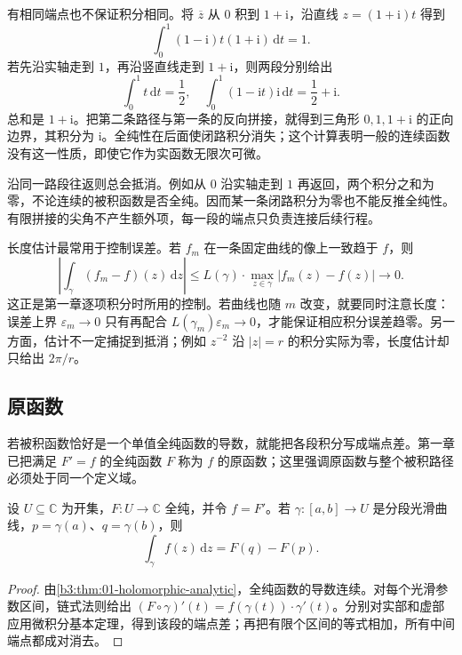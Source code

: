 \ProseParagraphBreak

有相同端点也不保证积分相同。将 \(\overline z\) 从 \(0\) 积到 \(1+\mathrm{i}\)，沿直线 \(z=(1+\mathrm{i})t\) 得到
\[
 \int_0^1(1-\mathrm{i})t(1+\mathrm{i})\,\mathrm{d}t=1.
\]
若先沿实轴走到 \(1\)，再沿竖直线走到 \(1+\mathrm{i}\)，则两段分别给出
\[
 \int_0^1t\,\mathrm{d}t=\frac12,
 \quad
 \int_0^1(1-\mathrm{i}t)\mathrm{i}\,\mathrm{d}t
 =\frac12+\mathrm{i}.
\]
总和是 \(1+\mathrm{i}\)。把第二条路径与第一条的反向拼接，就得到三角形 \(0,1,1+\mathrm{i}\) 的正向边界，其积分为 \(\mathrm{i}\)。全纯性在后面使闭路积分消失；这个计算表明一般的连续函数没有这一性质，即使它作为实函数无限次可微。

\ProseParagraphBreak

沿同一路段往返则总会抵消。例如从 \(0\) 沿实轴走到 \(1\) 再返回，两个积分之和为零，不论连续的被积函数是否全纯。因而某一条闭路积分为零也不能反推全纯性。有限拼接的尖角不产生额外项，每一段的端点只负责连接后续行程。

\ProseParagraphBreak

长度估计最常用于控制误差。若 \(f_m\) 在一条固定曲线的像上一致趋于 \(f\)，则
\[
 \left|\int_\gamma(f_m-f)(z)\,\mathrm{d}z\right|
 \le L(\gamma)\cdot\max_{z\in\gamma}|f_m(z)-f(z)|
 \longrightarrow0.
\]
这正是第一章逐项积分时所用的控制。若曲线也随 \(m\) 改变，就要同时注意长度：误差上界 \(\varepsilon_m\to0\) 只有再配合 \(L(\gamma_m)\varepsilon_m\to0\)，才能保证相应积分误差趋零。另一方面，估计不一定捕捉到抵消；例如 \(z^{-2}\) 沿 \(|z|=r\) 的积分实际为零，长度估计却只给出 \(2\pi/r\)。

\subsection{原函数}
\label{b3:subsec:020103}

若被积函数恰好是一个单值全纯函数的导数，就能把各段积分写成端点差。第一章已把满足 \(F'=f\) 的全纯函数 \(F\) 称为 \(f\) 的原函数；这里强调原函数与整个被积路径必须处于同一个定义域。

\begin{proposition}[原函数的端点公式]\label{b3:prop:02-primitive-endpoints}
设 \(U\subseteq\mathbb C\) 为开集，\(F:U\to\mathbb C\) 全纯，并令 \(f=F'\)。若 \(\gamma:[a,b]\to U\) 是分段光滑曲线，\(p=\gamma(a)\)、\(q=\gamma(b)\)，则
\[
 \int_\gamma f(z)\,\mathrm{d}z=F(q)-F(p).
\]
\end{proposition}
\begin{proof}
由\cref{b3:thm:01-holomorphic-analytic}，全纯函数的导数连续。对每个光滑参数区间，链式法则给出
\((F\circ\gamma)'(t)=f(\gamma(t))\cdot\gamma'(t)\)。分别对实部和虚部应用微积分基本定理，得到该段的端点差；再把有限个区间的等式相加，所有中间端点都成对消去。
\end{proof}

